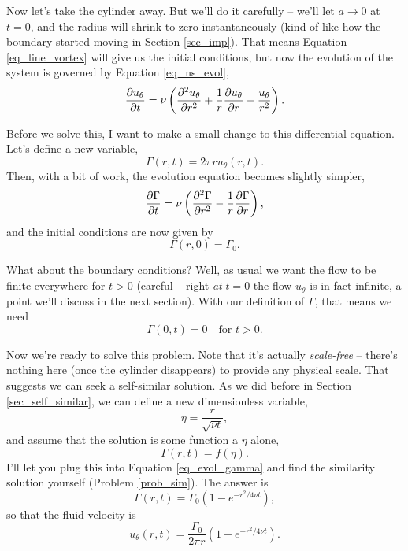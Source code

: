 Now let's take the cylinder away.  But we'll do it carefully -- we'll let $a \to 0$ at $t=0$, and the radius will shrink to zero instantaneously (kind of like how the boundary started moving in Section \ref{sec_imp}).  That means Equation \ref{eq_line_vortex} will give us the initial conditions, but now the evolution of the system is governed by Equation \ref{eq_ns_evol},
\[
\frac{\partial {u_\theta}}{\partial {t}} =  \nu \left( \frac{\partial^2 {u_\theta}}{\partial {r}^2} + \frac{1}{r} \frac{\partial {u_\theta}}{\partial {r}} - \frac{u_\theta}{r^2} \right).
\]

Before we solve this, I want to make a small change to this differential equation.  Let's define a new variable,
\begin{equation}
\Gamma (r, t) = 2\pi r u_\theta(r, t).
\end{equation}
Then, with a bit of work, the evolution equation becomes slightly simpler,
\begin{equation}
\label{eq_evol_gamma}
\frac{\partial {\Gamma}}{\partial {t}} = \nu \left( \frac{\partial^2 {\Gamma}}{\partial {r}^2} - \frac{1}{r} \frac{\partial {\Gamma}}{\partial {r}} \right),
\end{equation}
and the initial conditions are now given by
\begin{equation}
\Gamma(r, 0) = \Gamma_0.
\end{equation}

What about the boundary conditions?  Well, as usual we want the flow to be finite everywhere for $t>0$ (careful -- right \emph{at} $t=0$ the flow $u_\theta$ is in fact infinite, a point we'll discuss in the next section).  With our definition of $\Gamma$, that means we need
\begin{equation}
\Gamma(0, t) = 0 \quad \text{for } t>0.
\end{equation}

Now we're ready to solve this problem.  Note that it's actually \emph{scale-free} -- there's nothing here (once the cylinder disappears) to provide any physical scale.  That suggests we can seek a self-similar solution. As we did before in Section \ref{sec_self_similar}, we can define a new dimensionless variable,
\begin{equation}
\eta = \frac{r}{\sqrt{\nu t}},
\end{equation}
and assume that the solution is some function a $\eta$ alone,
\[
\Gamma(r, t) = f(\eta).
\]
I'll let you plug this into Equation \ref{eq_evol_gamma} and find the similarity solution yourself (Problem \ref{prob_sim}).  The answer is
\[
\Gamma(r, t) = \Gamma_0 \left(1 - e^{-r^2 / 4\nu t} \right),
\]
so that the fluid velocity is
\begin{equation}
\label{eq_line_vortex_vel}
u_\theta(r, t) = \frac{\Gamma_0}{2\pi r} \left( 1- e^{-r^2 / 4 \nu t} \right).
\end{equation}

